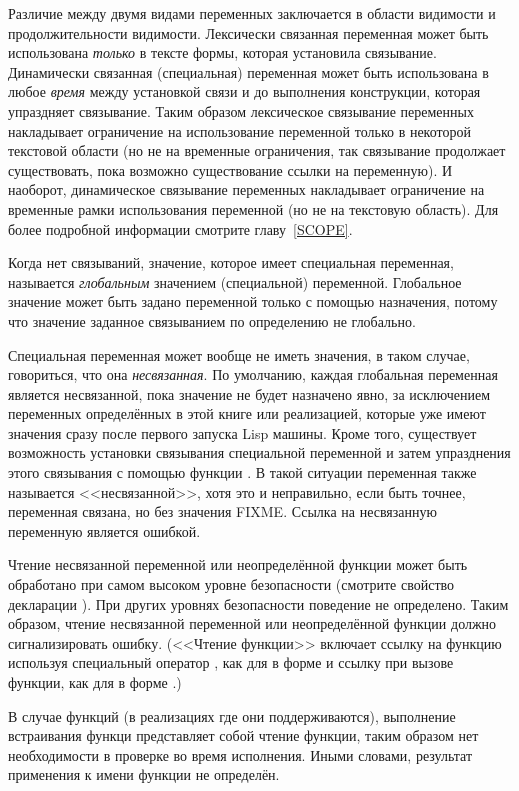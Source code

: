Различие между двумя видами переменных заключается в области видимости и
продолжительности видимости. Лексически связанная переменная может быть использована
\emph{только} в тексте формы, которая установила связывание. Динамически
связанная (специальная) переменная может быть использована в любое
\emph{время} между установкой связи и до выполнения конструкции, которая
упраздняет связывание. Таким образом лексическое связывание переменных
накладывает ограничение на использование переменной только в некоторой текстовой
области (но не на временные ограничения, так связывание продолжает существовать,
пока возможно существование ссылки на переменную). И наоборот, динамическое
связывание переменных накладывает ограничение на временные рамки использования
переменной (но не на текстовую область).
Для более подробной информации смотрите главу~\ref{SCOPE}.

Когда нет связываний, значение, которое имеет специальная
переменная, называется \emph{глобальным} значением (специальной) переменной.
Глобальное значение может быть задано переменной только с помощью назначения,
потому что значение заданное связыванием по определению не глобально.

Специальная переменная может вообще не иметь значения, в таком случае,
говориться, что она \emph{несвязанная}. 
По умолчанию, каждая глобальная переменная является несвязанной, пока значение
не будет назначено явно, за исключением переменных определённых в этой книге или
реализацией, которые уже имеют значения сразу после первого запуска Lisp машины.
Кроме того, существует возможность установки связывания специальной переменной и
затем упразднения этого связывания с помощью функции . В такой
ситуации переменная также называется <<несвязанной>>, хотя это и неправильно,
если быть точнее, переменная связана, но без значения FIXME. Ссылка на несвязанную
переменную является ошибкой.

Чтение несвязанной переменной или неопределённой функции может быть обработано
при самом высоком уровне безопасности (смотрите свойство 
декларации ). При других уровнях безопасности поведение не
определено.
Таким образом, чтение несвязанной переменной или неопределённой функции должно
сигнализировать ошибку.
(<<Чтение функции>> включает ссылку на функцию используя специальный оператор
, как для  в форме  и ссылку при вызове
функции, как для  в форме .)

В случае  функций (в реализациях где они поддерживаются),
выполнение встраивания функци представляет собой чтение функции, таким образом
нет необходимости в проверке  во время исполнения. Иными словами,
результат применения  к имени  функции не определён.



